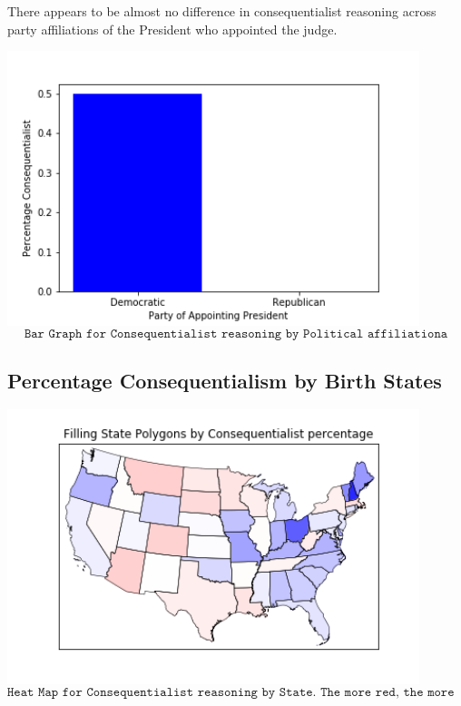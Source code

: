 \documentclass{article}
\begin{document}
There appears to be almost no difference in consequentialist reasoning across party affiliations of the President who appointed the judge.

\begin{center}
\includegraphics[width = 12cm, height = 8cm]{party.png}
    \[\texttt{Bar Graph for Consequentialist reasoning by Political affiliationa}\]
\end{center}

\subsection{Percentage Consequentialism by Birth States}

\begin{center}
\includegraphics[width = 12cm, height = 8cm]{map.png}
    \[\texttt{Heat Map for Consequentialist reasoning by State. The more red, the more consequentialist of reasoning}\]
\end{center}
\end{document}
